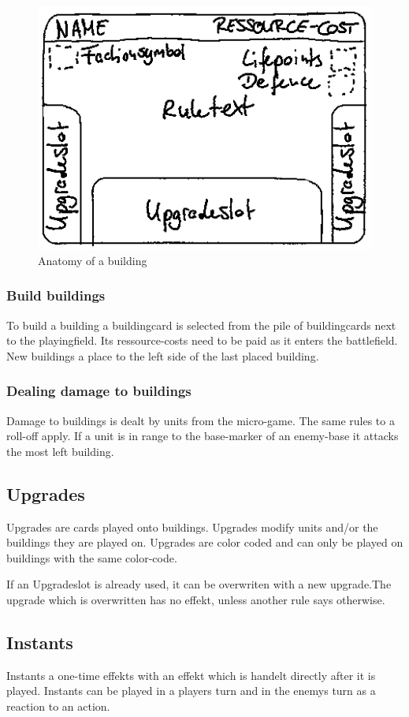 \documentclass[a5paper,pagesize,10pt,bibtotoc,pointlessnumbers,
normalheadings,DIV=9,twoside=false]{scrbook}
\begin{document}
\begin{figure}[t]
\includegraphics[scale=0.6]{Building}
\centering
\caption{Anatomy of a building}
\end{figure}

\subsubsection{Build buildings}
To build a building a buildingcard is selected from the pile of buildingcards next to the playingfield. Its ressource-costs need to be paid as it enters the battlefield.
New buildings a place to the left side of the last placed building.

\subsubsection{Dealing damage to buildings}
Damage to buildings is dealt by units from the micro-game. The same rules to a roll-off apply. If a unit is in range to the base-marker of an enemy-base it attacks the most left building.

\subsection{Upgrades}
Upgrades are cards played onto buildings. Upgrades modify units and/or the buildings they are played on. Upgrades are color coded and can only be played on buildings with the same color-code.

If an Upgradeslot is already used, it can be overwriten with a new upgrade.The upgrade which is overwritten has no effekt, unless another rule says otherwise.

\subsection{Instants}
Instants a one-time effekts with an effekt which is handelt directly after it is played. Instants can be played in a players turn and in the enemys turn as a reaction to an action.
\end{document}
